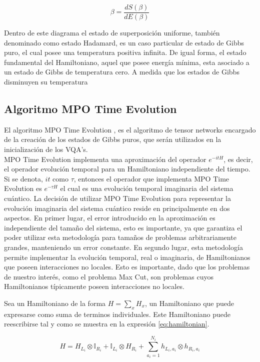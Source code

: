 \begin{equation}
  \beta = \frac{d S(\beta)}{d E(\beta)}
  \label{eq:temperature}
\end{equation}

Dentro de este diagrama el estado de superposición uniforme, también denominado como estado Hadamard, es un caso particular de estado de Gibbs puro, el cual posee una temperatura positiva infinita. De igual forma, el estado fundamental del Hamiltoniano, aquel que posee energía mínima, esta asociado a un estado de Gibbs de temperatura cero. A medida que los estados de Gibbs disminuyen su temperatura 

\subsection{Algoritmo MPO Time Evolution}

El algoritmo MPO Time Evolution \citep{zaletel}, es el algoritmo de tensor networks encargado de la creación de los estados de Gibbs puros, que serán utilizados en la inicialización de los VQA's.\\

MPO Time Evolution implementa una aproximación del operador $e^{- i t H}$, es decir, el operador evolución temporal para un Hamiltoniano independiente del tiempo. Si se denota, $i t$ como $\tau$, entonces el operador que implementa MPO Time Evolution es $e^{- \tau H}$ el cual es una evolución temporal imaginaria del sistema cuántico. La decisión de utilizar MPO Time Evolution para representar la evolución imaginaria del sistema cuántico reside en principalmente en dos aspectos. En primer lugar, el error introducido en la aproximación es independiente del tamaño del sistema, esto es importante, ya que garantiza el poder utilizar esta metodología para tamaños de problemas arbitrariamente grandes, manteniendo un error constante. En segundo lugar, esta metodología permite implementar la evolución temporal, real o imaginaria, de Hamiltonianos que poseen interacciones no locales. Esto es importante, dado que los problemas de nuestro interés, como el problema Max Cut, son problemas cuyos Hamiltonianos típicamente poseen interacciones no locales. 

\newpage

Sea un Hamiltoniano de la forma $H = \sum_{x} H_{x}$, un Hamiltoniano que puede expresarse como suma de terminos individuales. Este Hamiltoniano puede reescribirse tal y como se muestra en la expresión \ref{eq:hamiltonian}.

\begin{equation}
  H = H_{L_i} \otimes \mathbb{I}_{R_i} + \mathbb{I}_{L_i} \otimes H_{R_i} + \sum_{a_i=1}^{N_i} h_{L_i, a_i} \otimes h_{R_i, a_i}
  \label{eq:hamiltonian}
\end{equation}

